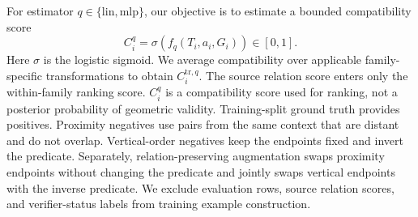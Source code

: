 For estimator $q\in\{\mathrm{lin},\mathrm{mlp}\}$, our objective is to estimate a bounded compatibility score
\begin{equation}
C_i^q=\sigma\!\left(f_q(T_i,a_i,G_i)\right)\in[0,1].
\end{equation}
Here $\sigma$ is the logistic sigmoid. We average compatibility over applicable family-specific transformations to obtain $C_i^{\mathrm{tr},q}$. The source relation score enters only the within-family ranking score. $C_i^q$ is a compatibility score used for ranking, not a posterior probability of geometric validity. Training-split ground truth provides positives. Proximity negatives use pairs from the same context that are distant and do not overlap. Vertical-order negatives keep the endpoints fixed and invert the predicate. Separately, relation-preserving augmentation swaps proximity endpoints without changing the predicate and jointly swaps vertical endpoints with the inverse predicate. We exclude evaluation rows, source relation scores, and verifier-status labels from training example construction.

